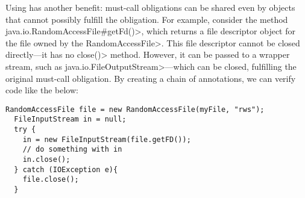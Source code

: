 Using \mccannot has another benefit: must-call obligations
can be shared even by objects that cannot possibly fulfill the
obligation. For example, consider the method
\<java.io.RandomAccessFile\#getFd()>, which returns a file descriptor
object for the file owned by the \<RandomAccessFile>. This file
descriptor cannot be closed directly---it has no \<close()> method.
However, it can be passed to a wrapper stream, such as
\<java.io.FileOutputStream>---which can be closed, fulfilling
the original must-call obligation. By creating a chain of \mccannot
annotations, we can verify code like the below:

\begin{lstlisting}[frame=tb,belowskip=3mm]
  RandomAccessFile file = new RandomAccessFile(myFile, "rws");
  FileInputStream in = null;
  try {
    in = new FileInputStream(file.getFD());
    // do something with in  
    in.close();
  } catch (IOException e){
    file.close();
  }
\end{lstlisting}


